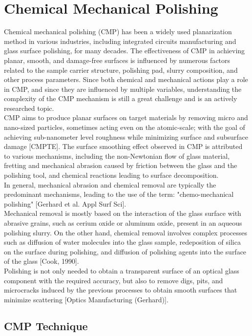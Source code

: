 \section{Chemical Mechanical Polishing}
\label{sec:CMP}
Chemical mechanical polishing (CMP) has been a widely used planarization method in various industries, including integrated circuits manufacturing and glass surface polishing, for many decades. The effectiveness of CMP in achieving planar, smooth, and damage-free surfaces is influenced by numerous factors related to the sample carrier structure, polishing pad, slurry composition, and other process parameters. Since both chemical and mechanical actions play a role in CMP, and since they are influenced by multiple variables, understanding the complexity of the CMP mechanism is still a great challenge and is an actively researched topic.
\\
CMP aims to produce planar surfaces on target materials by removing micro and nano-sized particles, sometimes acting even on the atomic-scale; with the goal of achieving sub-nanometer level roughness while minimizing surface and subsurface damage [CMPTE]. The surface smoothing effect observed in CMP is attributed to various mechanisms, including the non-Newtonian flow of glass material, fretting and mechanical abrasion caused by friction between the glass and the polishing tool, and chemical reactions leading to surface decomposition.
\\
In general, mechanical abrasion and chemical removal are typically the predominant mechanisms, leading to the use of the term: "chemo-mechanical polishing" [Gerhard et al. Appl Surf Sci].
\\
Mechanical removal is mostly based on the interaction of the glass surface with abrasive grains, such as cerium oxide or aluminum oxide, present in an aqueous polishing slurry. On the other hand, chemical removal involves complex processes such as diffusion of water molecules into the glass sample, redeposition of silica on the surface during polishing, and diffusion of polishing agents into the surface of the glass [Cook, 1990].
\\
Polishing is not only needed to obtain a transparent surface of an optical glass component with the required accuracy, but also to remove digs, pits, and microcracks induced by the previous processes to obtain smooth surfaces that minimize scattering [Optics Manufacturing (Gerhard)].

\subsection{CMP Technique}
\label{subsec:cmp_technique}

